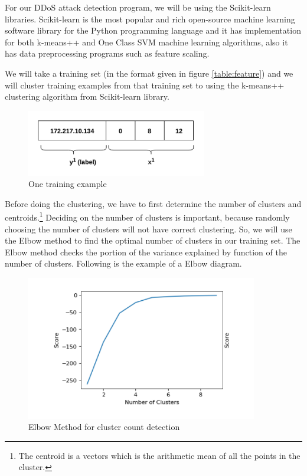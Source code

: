 \documentclass[12pt,oneside,a4paper]{article}
\begin{document}
For our DDoS attack detection program, we will be using the Scikit-learn libraries. Scikit-learn is the most popular and rich open-source machine learning software library for the Python programming language and it has implementation for both k-means++ and One Class SVM machine learning algorithms, also it has data preprocessing programs such as feature scaling.

We will take a training set (in the format given in figure \ref{table:feature}) and we will cluster training examples from that training set to using the k-means++ clustering algorithm from Scikit-learn library.

\begin{figure}[H]
\centering
\includegraphics[width=0.70\textwidth]{training_example.png}
\caption{One training example} \label{fig:training_example}
\end{figure}

Before doing the clustering, we have to first determine the number of clusters and centroids.\footnote{The centroid is a vectors which is the arithmetic mean of all the points in the cluster.} Deciding on the number of clusters is important, because randomly choosing the number of clusters will not have correct clustering. So, we will use the Elbow method to find the optimal number of clusters in our training set. The Elbow method checks the portion of the variance explained by function of the number of clusters. Following is the example of a Elbow diagram.

\begin{figure}[H]
\centering
\includegraphics[width=0.90\textwidth]{elbow-method.png}
\caption{Elbow Method for cluster count detection} \label{fig:elbow-method}
\end{figure}
\end{document}
